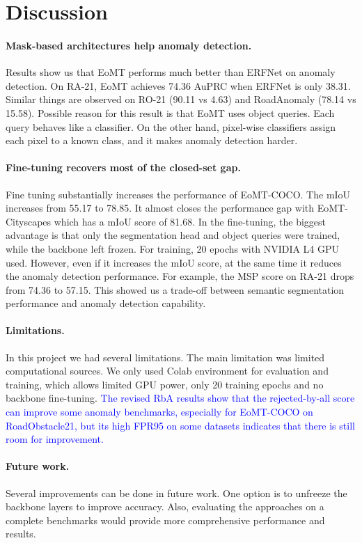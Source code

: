 \section{Discussion}
\label{sec:discussion}

\paragraph{Mask-based architectures help anomaly detection.}

Results show us that EoMT performs much better than ERFNet on anomaly detection.
On RA-21, EoMT achieves 74.36 AuPRC when ERFNet is only 38.31.
Similar things are observed on RO-21 (90.11 vs 4.63) and RoadAnomaly (78.14 vs 15.58).
Possible reason for this result is that EoMT uses object queries. Each query behaves like a classifier.
On the other hand, pixel-wise classifiers assign each pixel to a known class, and it makes anomaly detection harder.

\paragraph{Fine-tuning recovers most of the closed-set gap.}

Fine tuning substantially increases the performance of EoMT-COCO. 
The mIoU increases from 55.17 to 78.85. It almost closes the performance gap with EoMT-Cityscapes which has a mIoU score of 81.68.
In the fine-tuning, the biggest advantage is that only the segmentation head and object queries were trained, while the backbone left frozen.
For training, 20 epochs with NVIDIA L4 GPU used. However, even if it increases the mIoU score, at the same time it reduces the anomaly detection performance.
For example, the MSP score on RA-21 drops from 74.36 to 57.15. 
This showed us a trade-off between semantic segmentation performance and anomaly detection capability.

\paragraph{Limitations.}

In this project we had several limitations. The main limitation was limited computational sources. 
We only used Colab environment for evaluation and training, which allows limited GPU power, only 20 training epochs and no backbone fine-tuning.
\textcolor{blue}{The revised RbA results show that the rejected-by-all score can improve some anomaly benchmarks, especially for EoMT-COCO on RoadObstacle21, but its high FPR95 on some datasets indicates that there is still room for improvement.}
\paragraph{Future work.}

Several improvements can be done in future work. One option is to unfreeze the backbone layers to improve accuracy. 
Also, evaluating the approaches on a complete benchmarks would provide more comprehensive performance and results.
